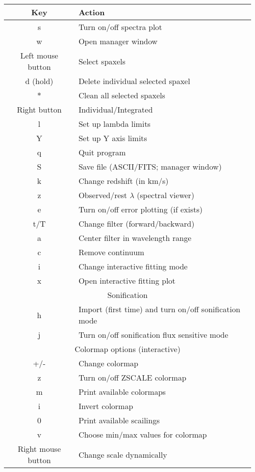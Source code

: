 \documentclass[11pt]{article}
\begin{document}
\centering
\setlength{\tabcolsep}{1cm}
\begin{tabular} {c l}
\hline
\rowcolor{MilkTea!25!white}
Key & Action \\
\hline
s & Turn on/off spectra plot\\
w & Open manager window \\
Left mouse button & Select spaxels \\
d (hold) & Delete individual selected spaxel \\
$*$ & Clean all selected spaxels\\
Right button & Individual/Integrated \\
l & Set up lambda limits\\
Y & Set up Y axis limits\\
q & Quit program\\
S & Save file (ASCII/FITS; manager window) \\
k & Change redshift (in km/s) \\
z & Observed/rest $\lambda$ (spectral viewer) \\
e & Turn on/off error plotting (if exists) \\
t/T &  Change filter (forward/backward) \\
a & Center filter in wavelength range \\
c & Remove continuum \\
i & Change interactive fitting mode \\
x & Open interactive fitting plot \\
\multicolumn{2}{c}{\cellcolor{MilkTea!25!white} Sonification} \\
h & Import (first time) and turn on/off sonification mode \\ 
j & Turn on/off sonification flux sensitive mode \\
\multicolumn{2}{c}{\cellcolor{MilkTea!25!white} Colormap options (interactive)} \\
+/- & Change colormap \\
z & Turn on/off ZSCALE colormap\\
m & Print available colormaps \\
i & Invert colormap \\
0 & Print available scailings \\
v & Choose min/max values for colormap \\
Right mouse button & Change scale dynamically\\

\end{tabular}
\end{document}
